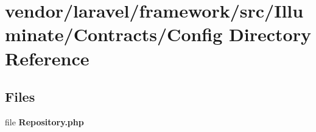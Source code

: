 \section{vendor/laravel/framework/src/\+Illuminate/\+Contracts/\+Config Directory Reference}
\label{dir_17dc13b60b65712b72700534cff8c72d}
\subsection*{Files}
\begin{DoxyCompactItemize}
\item 
file {\bf Repository.\+php}
\end{DoxyCompactItemize}
